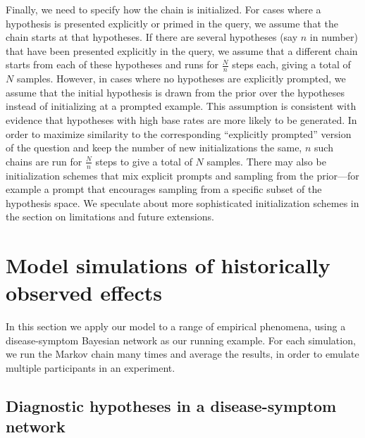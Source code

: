 Finally, we need to specify how the chain is initialized. For cases where a hypothesis is presented explicitly or primed in the query, we assume that the chain starts at that hypotheses.
If there are several hypotheses (say $n$ in number) that have been presented explicitly in the query, we assume
that a different chain starts from each of these hypotheses and runs for $\frac{N}{n}$ steps each, giving a total of $N$ samples. However, in cases where no hypotheses are explicitly prompted, we assume that the initial hypothesis is drawn from the prior over the hypotheses instead of initializing at a prompted example. This assumption is consistent with evidence that hypotheses with high base rates are more likely to be generated.\citep{weber1993} In order to maximize similarity to the corresponding ``explicitly prompted'' version of the question and keep the number of new initializations the same, $n$ such chains are run for $\frac{N}{n}$ steps to give a total of $N$ samples.
There may also be initialization schemes that mix explicit prompts and sampling from the prior---for example a prompt that encourages sampling from a specific subset of the hypothesis space. We speculate about more sophisticated initialization schemes in the section on limitations and future extensions.


\section{Model simulations of historically observed effects}

In this section we apply our model to a range of empirical phenomena, using a disease-symptom Bayesian network as our running example. For each simulation, we run the Markov chain many times and average the results, in order to emulate multiple participants in an experiment.

\subsection{Diagnostic hypotheses in a disease-symptom network}

